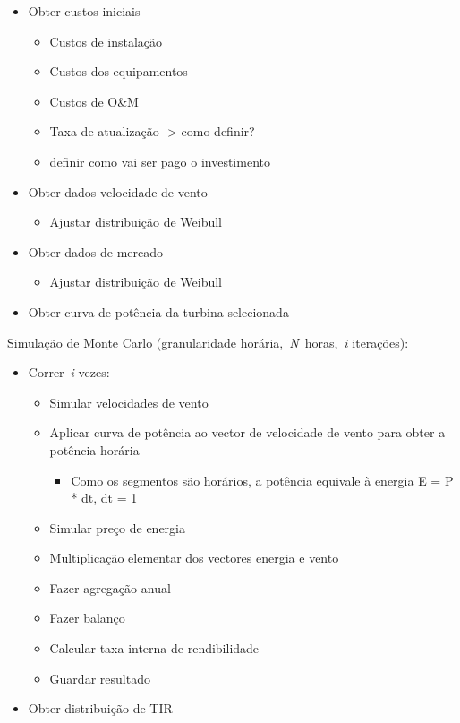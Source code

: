 \documentclass[
  letterpaper,
  DIV=11,
  numbers=noendperiod]{scrartcl}
\providecommand{\tightlist}{%
  \setlength{\itemsep}{0pt}\setlength{\parskip}{0pt}}\usepackage{longtable,booktabs,array}
\begin{document}
\begin{itemize}
\item
  Obter custos iniciais

  \begin{itemize}
  \item
    Custos de instalação
  \item
    Custos dos equipamentos
  \item
    Custos de O\&M
  \item
    Taxa de atualização -\textgreater{} como definir?
  \item
    definir como vai ser pago o investimento
  \end{itemize}
\item
  Obter dados velocidade de vento

  \begin{itemize}
  \tightlist
  \item
    Ajustar distribuição de Weibull
  \end{itemize}
\item
  Obter dados de mercado

  \begin{itemize}
  \tightlist
  \item
    Ajustar distribuição de Weibull
  \end{itemize}
\item
  Obter curva de potência da turbina selecionada
\end{itemize}

Simulação de Monte Carlo (granularidade
horária,~\emph{N}~horas,~\emph{i} iterações):

\begin{itemize}
\item
  Correr~\emph{i} vezes:

  \begin{itemize}
  \item
    Simular velocidades de vento
  \item
    Aplicar curva de potência ao vector de velocidade de vento para
    obter a potência horária

    \begin{itemize}
    \tightlist
    \item
      Como os segmentos são horários, a potência equivale à energia E =
      P * dt, dt = 1
    \end{itemize}
  \item
    Simular preço de energia
  \item
    Multiplicação elementar dos vectores energia e vento
  \item
    Fazer agregação anual
  \item
    Fazer balanço
  \item
    Calcular taxa interna de rendibilidade
  \item
    Guardar resultado
  \end{itemize}
\item
  Obter distribuição de TIR
\end{itemize}
\end{document}
